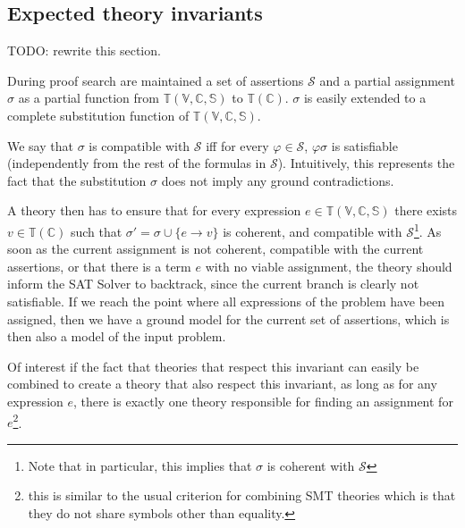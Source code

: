 \documentclass{article}
\begin{document}
\subsection{Expected theory invariants}

TODO: rewrite this section.

During proof search are maintained a set of assertions $\mathcal{S}$
and a partial assignment $\sigma$ as a partial function from $\mathbb{T}(\mathbb{V, C, S})$
to $\mathbb{T}(\mathbb{C})$. $\sigma$ is easily extended to a complete substitution function of
$\mathbb{T}(\mathbb{V, C, S})$.

We say that $\sigma$ is compatible with $\mathcal{S}$ iff for every $\varphi \in \mathcal{S}$,
$\varphi\sigma$ is satisfiable (independently from the rest of the formulas in $\mathcal{S}$).
Intuitively, this represents the fact that the substitution $\sigma$ does not imply any
ground contradictions.

A theory then has to ensure that for every expression $e \in \mathbb{T}(\mathbb{V,C,S})$
there exists $v \in \mathbb{T}(\mathbb{C})$ such that $\sigma' = \sigma \cup \{ e \rightarrow v \}$
is coherent, and compatible with $\mathcal{S}$\footnote{Note that in particular, this implies
that $\sigma$ is coherent with $\mathcal{S}$}. As soon as the current assignment is not coherent,
compatible with the current assertions, or that there is a term $e$ with no viable assignment, the theory
should inform the SAT Solver to backtrack, since the current branch is clearly not satisfiable.
If we reach the point where all expressions of the problem have been assigned, then we
have a ground model for the current set of assertions, which is then also a model
of the input problem.

Of interest if the fact that theories that respect this invariant can easily be combined
to create a theory that also respect this invariant, as long as for any expression $e$,
there is exactly one theory responsible for finding an assignment for $e$\footnote{this
is similar to the usual criterion for combining SMT theories which is that they do not
share symbols other than equality.}.


\clearpage




\clearpage
\appendix
\end{document}
